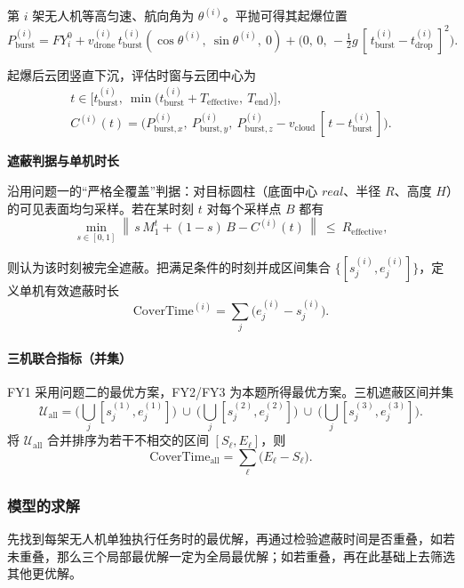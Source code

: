 \documentclass[withoutpreface,bwprint]{cumcmthesis} %
\begin{document}
第 $i$ 架无人机等高匀速、航向角为 $\theta^{(i)}$。平抛可得其起爆位置
\begin{equation}
	P_{\text{burst}}^{(i)}
	=
	FY_i^0
	+ v_{\text{drone}}^{(i)}\,t_{\text{burst}}^{(i)}(\cos\theta^{(i)},\ \sin\theta^{(i)},\ 0)
	+ \big(0,\,0,\,-\tfrac12 g\,[\,t_{\text{burst}}^{(i)}-t_{\text{drop}}^{(i)}\,]^2\big).
\end{equation}

起爆后云团竖直下沉，评估时窗与云团中心为
\begin{gather}
	t\in\Big[t_{\text{burst}}^{(i)},\ \min\big(t_{\text{burst}}^{(i)}+T_{\text{effective}},\ T_{\text{end}}\big)\Big],\\
	C^{(i)}(t)=\Big(P_{\text{burst},x}^{(i)},\ P_{\text{burst},y}^{(i)},\ P_{\text{burst},z}^{(i)}-v_{\text{cloud}}\,[\,t-t_{\text{burst}}^{(i)}\,]\Big).
\end{gather}

\textbf{遮蔽判据与单机时长}

沿用问题一的“严格全覆盖”判据：对目标圆柱（底面中心 $real$、半径 $R$、高度 $H$）的可见表面均匀采样。若在某时刻 $t$ 对每个采样点 $B$ 都有
\begin{equation}
	\min_{s\in[0,1]}
	\left\|\,s\,M_1^{t}+(1-s)\,B - C^{(i)}(t)\,\right\|
	\ \le\ R_{\text{effective}},
\end{equation}

则认为该时刻被完全遮蔽。把满足条件的时刻并成区间集合 $\{[s_j^{(i)},e_j^{(i)}]\}$，定义单机有效遮蔽时长
\begin{equation}
	\text{CoverTime}^{(i)}=\sum_j \big(e_j^{(i)}-s_j^{(i)}\big).
\end{equation}

\paragraph{三机联合指标（并集）}
FY1 采用问题二的最优方案，FY2/FY3 为本题所得最优方案。三机遮蔽区间并集
\begin{equation}
	\mathcal{U}_{\text{all}}
	=\Big(\bigcup_j [s_j^{(1)},e_j^{(1)}]\Big)\ \cup\ \Big(\bigcup_j [s_j^{(2)},e_j^{(2)}]\Big)\ \cup\ \Big(\bigcup_j [s_j^{(3)},e_j^{(3)}]\Big).
\end{equation}
将 $\mathcal{U}_{\text{all}}$ 合并排序为若干不相交的区间 $[S_\ell,E_\ell]$，则
\begin{equation}
	\text{CoverTime}_{\text{all}}=\sum_{\ell}\big(E_\ell - S_\ell\big).
\end{equation}

\subsubsection{模型的求解}
先找到每架无人机单独执行任务时的最优解，再通过检验遮蔽时间是否重叠，如若未重叠，那么三个局部最优解一定为全局最优解；如若重叠，再在此基础上去筛选其他更优解。
\end{document}
